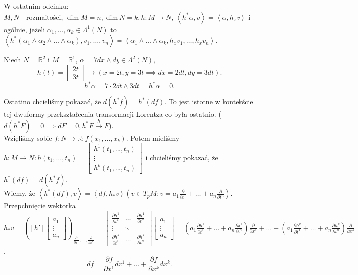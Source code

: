 \documentclass[../main.tex]{subfiles}
\begin{document}
    W ostatnim odcinku:\\
    $M, N$ - rozmaitości, $\dim M = n, \dim N = k, h: M\to N$, $\left<h^*\alpha,v \right> = \left<\alpha,h_xv \right>$ i ogólnie, jeżeli $\alpha_1,\ldots,\alpha_k\in \Lambda^1(N)$ to $\left< h^*(\alpha_1\land \alpha_2\land\ldots\land\alpha_k), v_1,\ldots,v_n\right> = \left<\alpha_1\land\ldots\land\alpha_k,h_xv_1,\ldots,h_xv_n \right>$.

    \begin{przyklad}
        Niech $N = \mathbb{R}^2$ i $M = \mathbb{R}^1$, $\alpha = 7dx\land dy\in \Lambda^2(N)$, \\
        \[
            h(t) = \begin{bmatrix} 2t\\3t \end{bmatrix} \to (x = 2t, y = 3t \implies dx = 2dt, dy = 3dt)
        .\]
        \[
        h^*\alpha = 7\cdot 2dt\land 3dt = h^*\alpha = 0
        .\]
    \end{przyklad}
    Ostatino chcieliśmy pokazać, że $d(h^*f) = h^*(df)$. To jest istotne w kontekście tej dwuformy przekształcenia transormacji Lorentza co była ostatnio. ($d(h^*F) = 0 \implies dF = 0, h^*F \overset{h}{\to} F$).\\
    Wzięliśmy sobie $f: N\to \mathbb{R}: f(x_1,\ldots,x_k)$. Potem mieliśmy $h: M\to N: h(t_1,\ldots,t_n) = \begin{bmatrix} h^1(t_1,\ldots,t_n)\\ \vdots \\ h^k(t_1,\ldots,t_n) \end{bmatrix} $ i chcieliśmy pokazać, że $h^*(df) = d(h^*f)$. \\
Wiemy, że  $\left<h^*(df),v \right> = \left<df,h_*v \right> (v\in T_pM: v = a_1 \frac{\partial }{\partial t^1} + \ldots + a_n \frac{\partial }{\partial t^n} )$. Przepchnięcie wektorka $h_*v = \left(\left[ h' \right] \begin{bmatrix} a_1\\ \vdots \\ a_n \end{bmatrix}\right)_{\frac{\partial }{\partial x^1} ,\ldots,\frac{\partial }{\partial x^k} } = \begin{bmatrix} \frac{\partial h^1}{\partial t^1} & \ldots & \frac{\partial h^1}{\partial t^n} \\ \vdots & \ddots & \\ \frac{\partial h^k}{\partial t^1} & \ldots & \frac{\partial h^k}{\partial t^n}  \end{bmatrix} \begin{bmatrix} a_1 \\ \vdots \\ a_n \end{bmatrix} = \left( a_1 \frac{\partial h^1}{\partial t^1} + \ldots + a_n \frac{\partial h^1}{\partial t^n}  \right) \frac{\partial }{\partial x^1} + \ldots + \left( a_1 \frac{\partial h^k}{\partial t^1} + \ldots + a_n \frac{\partial h^k}{\partial t^n} \right)\frac{\partial }{\partial x^k}$.\\
\[
df = \frac{\partial f}{\partial x^1} dx^1 + \ldots + \frac{\partial f}{\partial x^k} dx^k
.\]
\end{document}
